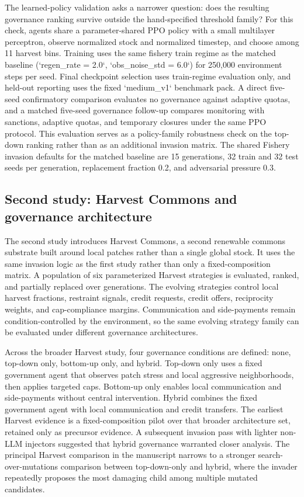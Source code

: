 The learned-policy validation asks a narrower question: does the resulting governance ranking survive outside the hand-specified threshold family? For this check, agents share a parameter-shared PPO policy with a small multilayer perceptron, observe normalized stock and normalized timestep, and choose among 11 harvest bins. Training uses the same fishery train regime as the matched baseline (`regen\_rate = 2.0`, `obs\_noise\_std = 6.0`) for 250{,}000 environment steps per seed. Final checkpoint selection uses train-regime evaluation only, and held-out reporting uses the fixed `medium\_v1` benchmark pack. A direct five-seed confirmatory comparison evaluates no governance against adaptive quotas, and a matched five-seed governance follow-up compares monitoring with sanctions, adaptive quotas, and temporary closures under the same PPO protocol. This evaluation serves as a policy-family robustness check on the top-down ranking rather than as an additional invasion matrix. The shared Fishery invasion defaults for the matched baseline are 15 generations, 32 train and 32 test seeds per generation, replacement fraction 0.2, and adversarial pressure 0.3.

\subsection{Second study: Harvest Commons and governance architecture}

The second study introduces Harvest Commons, a second renewable commons substrate built around local patches rather than a single global stock. It uses the same invasion logic as the first study rather than only a fixed-composition matrix. A population of six parameterized Harvest strategies is evaluated, ranked, and partially replaced over generations. The evolving strategies control local harvest fractions, restraint signals, credit requests, credit offers, reciprocity weights, and cap-compliance margins. Communication and side-payments remain condition-controlled by the environment, so the same evolving strategy family can be evaluated under different governance architectures.

Across the broader Harvest study, four governance conditions are defined: none, top-down only, bottom-up only, and hybrid. Top-down only uses a fixed government agent that observes patch stress and local aggressive neighborhoods, then applies targeted caps. Bottom-up only enables local communication and side-payments without central intervention. Hybrid combines the fixed government agent with local communication and credit transfers. The earliest Harvest evidence is a fixed-composition pilot over that broader architecture set, retained only as precursor evidence. A subsequent invasion pass with lighter non-LLM injectors suggested that hybrid governance warranted closer analysis. The principal Harvest comparison in the manuscript narrows to a stronger search-over-mutations comparison between top-down-only and hybrid, where the invader repeatedly proposes the most damaging child among multiple mutated candidates.

